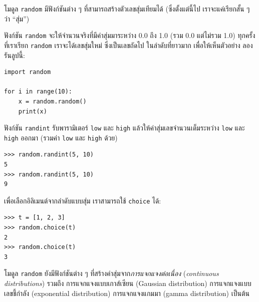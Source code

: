โมดูล \texttt{random} มีฟังก์ชันต่าง ๆ ที่สามารถสร้างตัวเลขสุ่มเทียมได้ 
(ซึ่งตั้งแต่นี้ไป เราจะแค่เรียกสั้น ๆ ว่า ``สุ่ม'')


ฟังก์ชัน \texttt{random} จะให้จำนวนจริงที่มีค่าสุ่มมาระหว่าง 0.0 ถึง 1.0 (รวม 0.0 แต่ไม่รวม 1.0)
ทุกครั้งที่เราเรียก \texttt{random}
เราจะได้เลขสุ่มใหม่ ซึ่งเป็นเลขถัดไป ในลำดับที่ยาวมาก
เพื่อให้เห็นตัวอย่าง ลองรันลูปนี้:

\begin{verbatim}
import random

for i in range(10):
    x = random.random()
    print(x)
\end{verbatim}
%
%
ฟังก์ชัน \texttt{randint} รับพารามิเตอร์ \texttt{low} และ \texttt{high}
แล้วให้ค่าสุ่มเลขจำนวนเต็มระหว่าง \texttt{low} และ \texttt{high} ออกมา 
(รวมค่า \texttt{low} และ \texttt{high} ด้วย)

\begin{verbatim}
>>> random.randint(5, 10)
5
>>> random.randint(5, 10)
9
\end{verbatim}
%
%
เพื่อเลือกอิลิเมนต์จากลำดับแบบสุ่ม
เราสามารถใช้ \texttt{choice} ได้:

\begin{verbatim}
>>> t = [1, 2, 3]
>>> random.choice(t)
2
>>> random.choice(t)
3
\end{verbatim}
%
%
โมดูล \texttt{random} ยังมีฟังก์ชันต่าง ๆ
ที่สร้างค่าสุ่มจาก\textit{การแจกแจงต่อเนื่อง} (\textit{continuous distributions})
รวมถึง การแจกแจงแบบเกาส์เซียน (Gaussian distribution)
การแจกแจงแบบเลขชี้กำลัง (exponential distribution)
การแจกแจงแกมมา (gamma distribution)
เป็นต้น


